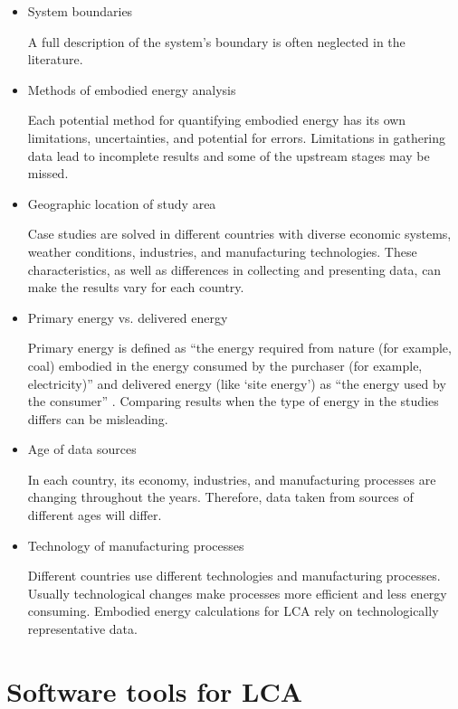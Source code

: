 \documentclass[10pt]{article}
\begin{document}
\begin{itemize}
\item  System boundaries

A full description of the system's boundary is often neglected in the literature. %
  
\item  Methods of embodied energy analysis

Each potential method for quantifying embodied energy has its own limitations, uncertainties, and potential for errors.  Limitations in gathering data lead to incomplete results and some of the upstream stages may be missed. 

\item  Geographic location of study area

Case studies are solved in different countries with diverse economic systems, weather conditions, industries, and manufacturing technologies. These  characteristics, as well as differences in collecting and presenting data, can  make the results vary for each country.

\item  Primary energy vs. delivered energy

Primary energy is defined as ``the energy required from nature (for example, coal) embodied in the energy consumed by the purchaser (for example, electricity)'' \cite{dixit2010identification} and delivered energy (like `site energy') as ``the energy used by the consumer'' \cite{dixit2010identification}. Comparing results when the type of energy in the studies differs can be misleading. 

\item Age of data sources

In each country, its economy, industries, and manufacturing processes are changing throughout the years. Therefore, data taken from sources of different ages will differ. 

 
\item Technology of manufacturing processes

Different countries use different technologies and manufacturing processes. Usually technological changes make processes more efficient and less energy consuming. Embodied energy calculations for LCA rely on technologically representative data. 
\end{itemize}

\section{Software tools for LCA} 
 
\end{document}

